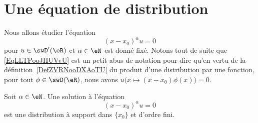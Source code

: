 \section{Une équation de distribution}

Nous allons étudier l'équation
\begin{equation}    \label{EqLLTPooJHUVvU}
    (x-x_0)^{\alpha}u=0
\end{equation}
pour \( u\in\swD'(\eR)\) et \( \alpha\in \eN\) est donné fixé. Notons tout de suite que \eqref{EqLLTPooJHUVvU} est un petit abus de notation pour dire qu'en vertu de la définition~\ref{DefZVRNooDXAoTU} du produit d'une distribution par une fonction, pour tout \( \phi\in\swD(\eR)\), nous avons \( u\Big( x\mapsto (x-x_0)\phi(x) \Big)=0\).

\begin{lemma}       \label{LemWIGKooQpGXoI}
    Soit \( \alpha\in \eN\). Une solution à l'équation
    \begin{equation}        \label{EqKVNEooJNwsPc}
        (x-x_0)^{\alpha}u=0
    \end{equation}
    est une distribution à support dans \( \{ x_0 \}\) et d'ordre fini.
\end{lemma}

